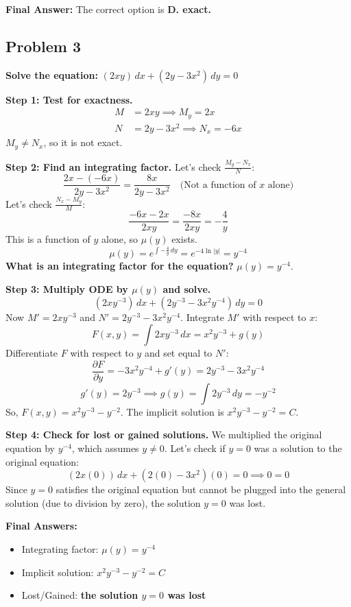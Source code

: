 \documentclass[11pt]{article}
\begin{document}
\textbf{Final Answer:} The correct option is \textbf{D. exact.}

\hrulefill

\subsection*{Problem 3}
\textbf{Solve the equation:} $(2xy) \, dx + (2y - 3x^2) \, dy = 0$

\textbf{Step 1: Test for exactness.}
\begin{align*}
    M &= 2xy \implies M_y = 2x \\
    N &= 2y - 3x^2 \implies N_x = -6x
\end{align*}
$M_y \neq N_x$, so it is not exact.

\textbf{Step 2: Find an integrating factor.} Let's check $\frac{M_y - N_x}{N}$:
\[ \frac{2x - (-6x)}{2y - 3x^2} = \frac{8x}{2y - 3x^2} \quad \text{(Not a function of $x$ alone)} \]
Let's check $\frac{N_x - M_y}{M}$:
\[ \frac{-6x - 2x}{2xy} = \frac{-8x}{2xy} = -\frac{4}{y} \]
This is a function of $y$ alone, so $\mu(y)$ exists.
\[ \mu(y) = e^{\int -\frac{4}{y} \, dy} = e^{-4\ln|y|} = y^{-4} \]
\textbf{What is an integrating factor for the equation?} $\mu(y) = y^{-4}$.

\textbf{Step 3: Multiply ODE by $\mu(y)$ and solve.}
\[ (2xy^{-3}) \, dx + (2y^{-3} - 3x^2y^{-4}) \, dy = 0 \]
Now $M' = 2xy^{-3}$ and $N' = 2y^{-3} - 3x^2y^{-4}$. Integrate $M'$ with respect to $x$:
\[ F(x, y) = \int 2xy^{-3} \, dx = x^2y^{-3} + g(y) \]
Differentiate $F$ with respect to $y$ and set equal to $N'$:
\[ \frac{\partial F}{\partial y} = -3x^2y^{-4} + g'(y) = 2y^{-3} - 3x^2y^{-4} \]
\[ g'(y) = 2y^{-3} \implies g(y) = \int 2y^{-3} \, dy = -y^{-2} \]
So, $F(x, y) = x^2y^{-3} - y^{-2}$. The implicit solution is $x^2y^{-3} - y^{-2} = C$.

\textbf{Step 4: Check for lost or gained solutions.} We multiplied the original equation by $y^{-4}$, which assumes $y \neq 0$. Let's check if $y = 0$ was a solution to the original equation:
\[ (2x(0)) \, dx + (2(0) - 3x^2)(0) = 0 \implies 0 = 0 \]
Since $y = 0$ satisfies the original equation but cannot be plugged into the general solution (due to division by zero), the solution $y = 0$ was lost.

\textbf{Final Answers:}
\begin{itemize}
    \item Integrating factor: $\mu(y) = y^{-4}$
    \item Implicit solution: $x^2y^{-3} - y^{-2} = C$
    \item Lost/Gained: \textbf{the solution $y = 0$ was lost}
\end{itemize}
\end{document}
